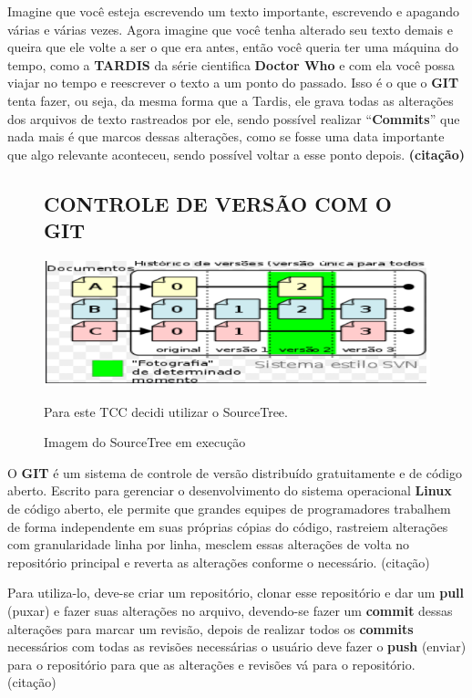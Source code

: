 		Imagine que você esteja escrevendo um texto importante, escrevendo e apagando várias e várias vezes. Agora imagine que você tenha alterado seu texto demais e queira que ele volte a ser o que era antes, então você queria ter uma máquina do tempo, como a \textbf{TARDIS} da série cientifica \textbf{Doctor Who} e com ela você possa viajar no tempo e reescrever o texto a um ponto do passado. Isso é o que o \textbf{GIT} tenta fazer, ou seja, da mesma forma que a Tardis, ele grava todas as alterações dos arquivos de texto rastreados por ele, sendo possível realizar “\textbf{Commits}” que nada mais é que marcos dessas alterações, como se fosse uma data importante que algo relevante aconteceu, sendo possível voltar a esse ponto depois. \textbf{(citação)} 

\begin{figure}
	\subsection{CONTROLE DE VERSÃO COM O GIT}
	\label{sec:CONTROLEVERSAOGIT}

	\centering
	\caption{Imagem do SourceTree em execução}
	\centering
	\includegraphics[scale=0.75]{./images/Figure_1}
	
	Para este TCC decidi utilizar o SourceTree.	
	
	\label{fig:Fig1}
\end{figure}

O \textbf{GIT} é um sistema de controle de versão distribuído gratuitamente e de código aberto. Escrito para gerenciar o
desenvolvimento do sistema operacional \textbf{Linux} de código aberto,
ele permite que grandes equipes de programadores trabalhem de
forma independente em suas próprias cópias do código, rastreiem
alterações com granularidade linha por linha, mesclem essas
alterações de volta no repositório principal e reverta as 
alterações conforme o necessário. (citação) 	

Para utiliza-lo, deve-se criar um repositório, clonar esse repositório e dar um \textbf{pull} (puxar) e fazer suas alterações no arquivo, devendo-se fazer um \textbf{commit} dessas alterações para marcar um revisão, depois de realizar todos os \textbf{commits} necessários com todas as revisões necessárias o usuário deve fazer o \textbf{push} (enviar) para o repositório para que as alterações e revisões vá para o repositório. (citação) 

